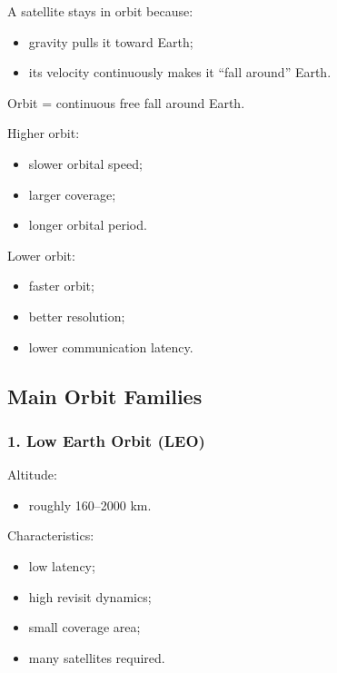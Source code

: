 \documentclass[10pt,a4paper,twocolumn]{article}
\begin{document}
A satellite stays in orbit because:
\begin{itemize}
    \item gravity pulls it toward Earth;
    \item its velocity continuously makes it ``fall around'' Earth.
\end{itemize}

\begin{keybox}
    Orbit = continuous free fall around Earth.
\end{keybox}

Higher orbit:
\begin{itemize}
    \item slower orbital speed;
    \item larger coverage;
    \item longer orbital period.
\end{itemize}

Lower orbit:
\begin{itemize}
    \item faster orbit;
    \item better resolution;
    \item lower communication latency.
\end{itemize}


\subsection{Main Orbit Families}


\subsubsection*{1. Low Earth Orbit (LEO)}

Altitude:
\begin{itemize}
    \item roughly 160--2000 km.
\end{itemize}

Characteristics:
\begin{itemize}
    \item low latency;
    \item high revisit dynamics;
    \item small coverage area;
    \item many satellites required.
\end{itemize}
\end{document}
